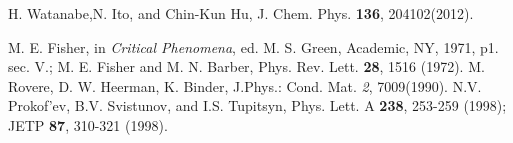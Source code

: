 \documentclass[prb,aps,twocolumn,groupedaddress,floats,showpacs,final]{revtex4}
\begin{document}
\begin{thebibliography}{99}
 H. Watanabe,N. Ito, and Chin-Kun Hu, J. Chem. Phys. {\bf 136}, 204102(2012).







 M. E. Fisher, in {\it Critical Phenomena}, ed. M. S. Green, Academic, NY, 1971, p1. sec. V.;
M. E. Fisher and M. N. Barber, Phys. Rev. Lett. {\bf 28}, 1516 (1972).
 M. Rovere, D. W. Heerman, K. Binder, J.Phys.: Cond. Mat. {\it 2}, 7009(1990).
   N.V. Prokof'ev, B.V. Svistunov, and I.S. Tupitsyn,
  Phys. Lett. A  {\bf 238}, 253-259 (1998);
 JETP {\bf 87}, 310-321 (1998).
 






\end{thebibliography}
\end{document}
